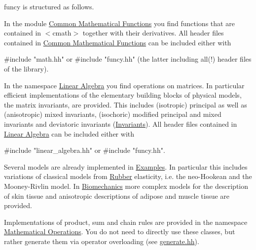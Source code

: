 funcy is structured as follows.


\begin{DoxyItemize}
\item In the module \hyperlink{group__CMathGroup}{Common Mathematical Functions} you find functions that are contained in {\ttfamily $<$cmath$>$} together with their derivatives. All header files contained in \hyperlink{group__CMathGroup}{Common Mathematical Functions} can be included either with 
\begin{DoxyPre}{\ttfamily #include "math.hh"} or {\ttfamily #include "funcy.hh"} (the latter including all(!) header files of the library).\end{DoxyPre}

\item In the namespace \hyperlink{group__LinearAlgebraGroup}{Linear Algebra} you find operations on matrices. In particular efficient implementations of the elementary building blocks of physical models, the matrix invariants, are provided. This includes (isotropic) principal as well as (anisotropic) mixed invariants, (isochoric) modified principal and mixed invariants and deviatoric invariants (\hyperlink{group__InvariantGroup}{Invariants}). All header files contained in \hyperlink{group__LinearAlgebraGroup}{Linear Algebra} can be included either with 
\begin{DoxyPre}{\ttfamily #include "linear\_algebra.hh"} or {\ttfamily #include "funcy.hh"}.\end{DoxyPre}

\item Several models are already implemented in \hyperlink{group__Examples}{Examples}. In particular this includes variations of classical models from \hyperlink{group__Rubber}{Rubber} elasticity, i.\-e. the neo-\/\-Hookean and the Mooney-\/\-Rivlin model. In \hyperlink{group__Biomechanics}{Biomechanics} more complex models for the description of skin tissue and anisotropic descriptions of adipose and muscle tissue are provided.
\item Implementations of product, sum and chain rules are provided in the namespace \hyperlink{group__MathematicalOperationsGroup}{Mathematical Operations}. You do not need to directly use these classes, but rather generate them via operator overloading (see \hyperlink{generate_8hh}{generate.\-hh}). 
\end{DoxyItemize}